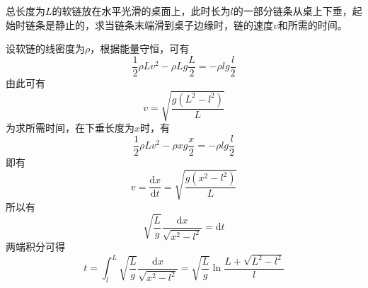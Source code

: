\begin{question}
总长度为$L$的软链放在水平光滑的桌面上，此时长为$l$的一部分链条从桌上下垂，起始时链条是静止的，求当链条末端滑到桌子边缘时，链的速度$v$和所需的时间。
\end{question}
\begin{solution}
设软链的线密度为$\rho$，根据能量守恒，可有
\begin{equation*}
	\frac12 \rho L v^2 - \rho L g \frac{L}{2} = -\rho l g \frac{l}{2}
\end{equation*}
由此可有
\begin{equation*}
	v = \sqrt{\frac{g(L^2-l^2)}{L}}
\end{equation*}
为求所需时间，在下垂长度为$x$时，有
\begin{equation*}
	\frac12 \rho L v^2 - \rho x g \frac{x}{2} = -\rho l g \frac{l}{2}
\end{equation*}
即有
\begin{equation*}
	v = \frac{\mathrm{d} x}{\mathrm{d} t} = \sqrt{\frac{g(x^2-l^2)}{L}}
\end{equation*}
所以有
\begin{equation*}
	\sqrt{\frac{L}{g}} \frac{\mathrm{d} x}{\sqrt{x^2-l^2}} = \mathrm{d} t
\end{equation*}
两端积分可得
\begin{equation*}
	t = \int_l^L \sqrt{\frac{L}{g}} \frac{\mathrm{d} x}{\sqrt{x^2-l^2}} = \sqrt{\frac{L}{g}} \ln \frac{L+\sqrt{L^2-l^2}}{l}
\end{equation*}
\end{solution}

